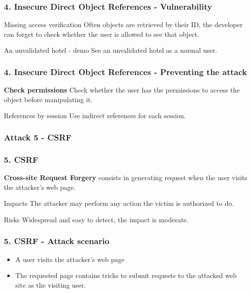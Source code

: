 \begin{frame}
\frametitle{4. Insecure Direct Object References - Vulnerability}
\begin{block}{Missing access verification}
Often objects are retrieved by their ID, the developer can forget to check
whether the user is allowed to see that object.
\end{block}
\pause
\begin{exampleblock}{An unvalidated hotel - demo}
See an unvalidated hotel as a normal user.
\end{exampleblock}
\end{frame}

\begin{frame}
\frametitle{4. Insecure Direct Object References - Preventing the attack}
\begin{block}{\textbf{Check permissions}}
Check whether the user has the permissions to access the object before
manipulating it.
\end{block}
\begin{block}{References by session}
Use indirect references for each session.
\end{block}
\end{frame}

\subsubsection{Attack 5 - CSRF}

\begin{frame}
\frametitle{5. CSRF}
\textbf{Cross-site Request Forgery} consists in generating request when the
user visits the attacker's web page.
\begin{block}{Impacts}
The attacker may perform any action the victim is authorized to do.
\end{block}
\begin{block}{Risks}
\alert{Widespread} and easy to detect, the impact is moderate.
\end{block}
\end{frame}

\begin{frame}
\frametitle{5. CSRF - Attack scenario}
\begin{itemize}
\item A user visits the attacker's web page
\item The requested page contains tricks to submit requests to the attacked
	web site as the visiting user.
\end{itemize}
\end{frame}

